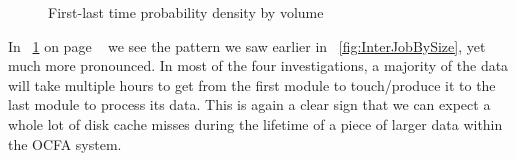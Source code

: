 \begin{figure}
{}
\caption{First-last time probability density by volume}
\label{fig:FirstLastBySize}
\end{figure}

In ~\ref{fig:FirstLastBySize} on page ~\pageref{fig:FirstLastBySize} we see the pattern we saw earlier in ~\ref{fig:InterJobBySize}, yet much more pronounced. In most of the four investigations, a majority of the data will take multiple hours to get from the first module to touch/produce it to the last module to process its data. This is again a clear sign that we can expect a whole lot of disk cache misses during the lifetime of a piece of larger data within the OCFA system.
